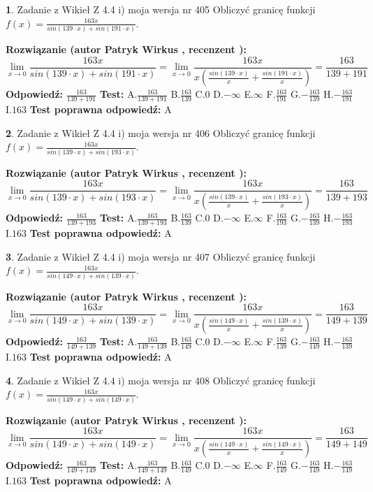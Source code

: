 \documentclass[12pt, a4paper]{article}
\theoremstyle{definition} %
\newtheorem{zad}{}
\newcommand{\zadStart}[1]{\begin{zad}#1\newline}
\newcommand{\zadStop}{\end{zad}}
\newcommand{\rozwStart}[2]{\noindent \textbf{Rozwiązanie (autor #1 , recenzent #2): }\newline}
\newcommand{\rozwStop}{\newline}
\newcommand{\odpStart}{\noindent \textbf{Odpowiedź:}\newline}
\newcommand{\odpStop}{\newline}
\newcommand{\testStart}{\noindent \textbf{Test:}\newline}
\newcommand{\testStop}{\newline}
\newcommand{\kluczStart}{\noindent \textbf{Test poprawna odpowiedź:}\newline}
\newcommand{\kluczStop}{\newline}
\begin{document}
\zadStart{Zadanie z Wikieł Z 4.4 i) moja wersja nr 405}
Obliczyć granicę funkcji $f(x)=\frac{163x}{sin(139\cdot x) +sin(191\cdot x)}$.
\zadStop
\rozwStart{Patryk Wirkus}{}
$$\lim\limits_{x\to 0}\frac{163x}{sin(139\cdot x) +sin(191\cdot x)}=\lim\limits_{x\to 0}\frac{163x}{x(\frac{sin(139\cdot x)}{x}+\frac{sin(191\cdot x)}{x})}=\frac{163}{139+191}$$
\rozwStop
\odpStart
$\frac{163}{139+191}$
\odpStop
\testStart
A.$\frac{163}{139+191}$
B.$\frac{163}{139}$
C.$0$
D.$-\infty$
E.$\infty$
F.$\frac{163}{191}$
G.$-\frac{163}{139}$
H.$-\frac{163}{191}$
I.$163$
\testStop
\kluczStart
A
\kluczStop



\zadStart{Zadanie z Wikieł Z 4.4 i) moja wersja nr 406}
Obliczyć granicę funkcji $f(x)=\frac{163x}{sin(139\cdot x) +sin(193\cdot x)}$.
\zadStop
\rozwStart{Patryk Wirkus}{}
$$\lim\limits_{x\to 0}\frac{163x}{sin(139\cdot x) +sin(193\cdot x)}=\lim\limits_{x\to 0}\frac{163x}{x(\frac{sin(139\cdot x)}{x}+\frac{sin(193\cdot x)}{x})}=\frac{163}{139+193}$$
\rozwStop
\odpStart
$\frac{163}{139+193}$
\odpStop
\testStart
A.$\frac{163}{139+193}$
B.$\frac{163}{139}$
C.$0$
D.$-\infty$
E.$\infty$
F.$\frac{163}{193}$
G.$-\frac{163}{139}$
H.$-\frac{163}{193}$
I.$163$
\testStop
\kluczStart
A
\kluczStop



\zadStart{Zadanie z Wikieł Z 4.4 i) moja wersja nr 407}
Obliczyć granicę funkcji $f(x)=\frac{163x}{sin(149\cdot x) +sin(139\cdot x)}$.
\zadStop
\rozwStart{Patryk Wirkus}{}
$$\lim\limits_{x\to 0}\frac{163x}{sin(149\cdot x) +sin(139\cdot x)}=\lim\limits_{x\to 0}\frac{163x}{x(\frac{sin(149\cdot x)}{x}+\frac{sin(139\cdot x)}{x})}=\frac{163}{149+139}$$
\rozwStop
\odpStart
$\frac{163}{149+139}$
\odpStop
\testStart
A.$\frac{163}{149+139}$
B.$\frac{163}{149}$
C.$0$
D.$-\infty$
E.$\infty$
F.$\frac{163}{139}$
G.$-\frac{163}{149}$
H.$-\frac{163}{139}$
I.$163$
\testStop
\kluczStart
A
\kluczStop



\zadStart{Zadanie z Wikieł Z 4.4 i) moja wersja nr 408}
Obliczyć granicę funkcji $f(x)=\frac{163x}{sin(149\cdot x) +sin(149\cdot x)}$.
\zadStop
\rozwStart{Patryk Wirkus}{}
$$\lim\limits_{x\to 0}\frac{163x}{sin(149\cdot x) +sin(149\cdot x)}=\lim\limits_{x\to 0}\frac{163x}{x(\frac{sin(149\cdot x)}{x}+\frac{sin(149\cdot x)}{x})}=\frac{163}{149+149}$$
\rozwStop
\odpStart
$\frac{163}{149+149}$
\odpStop
\testStart
A.$\frac{163}{149+149}$
B.$\frac{163}{149}$
C.$0$
D.$-\infty$
E.$\infty$
F.$\frac{163}{149}$
G.$-\frac{163}{149}$
H.$-\frac{163}{149}$
I.$163$
\testStop
\kluczStart
A
\kluczStop
\end{document}
